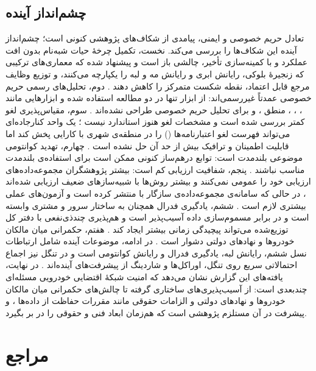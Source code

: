 \documentclass[12pt,a4paper]{article}
\begin{document}
\subsection{چشم‌انداز آینده}

تعادل حریم خصوصی و ایمنی، پیامدی از شکاف‌های پژوهشی کنونی است؛ چشم‌انداز آینده این شکاف‌ها را بررسی می‌کند. نخست، تکمیل چرخهٔ حیات شبه‌نام بدون افت عملکرد و با کمینه‌سازی تأخیر، چالشی باز است \cite{rahmawatiagustinaSystematicLiteratureReview2025} و پیشنهاد شده که معماری‌های ترکیبی که زنجیرهٔ بلوکی، رایانش ابری و رایانش مه و لبه را یکپارچه می‌کنند، و توزیع وظایف مرجع قابل اعتماد، نقطه شکست متمرکز را کاهش دهند \cite{rahmawatiagustinaSystematicLiteratureReview2025}. دوم، تحلیل‌های رسمی حریم خصوصی عمدتاً غیررسمی‌اند: از ابزار  تنها در دو مطالعه استفاده شده و ابزار‌هایی مانند ، ، ، منطق ،  و  برای تحلیل حریم خصوصی طراحی نشده‌اند \cite{rahmawatiagustinaSystematicLiteratureReview2025}. سوم، مقیاس‌پذیری لغو کمتر بررسی شده است و مشخصات لغو  هنوز استاندارد نیست \cite{mazzocca2025survey}؛ یک واحد کنارجاده‌ای می‌تواند فهرست لغو اعتبارنامه‌ها () را در منطقه‌ی شهری با کارایی پخش کند اما قابلیت اطمینان و ترافیک بیش از حد آن حل نشده است \cite{farsimadanReviewSecurityChallenges2025}. چهارم، تهدید کوانتومی موضوعی بلندمدت است: توابع درهم‌ساز کنونی ممکن است برای استفاده‌ی بلندمدت مناسب نباشند \cite{rahmawatiagustinaSystematicLiteratureReview2025}. پنجم، شفافیت ارزیابی کم است: بیشتر پژوهشگران مجموعه‌داده‌های ارزیابی خود را عمومی نمی‌کنند و بیشتر روش‌ها با شبیه‌سازهای ضعیف ارزیابی شده‌اند \cite{farsimadanReviewSecurityChallenges2025}، در حالی که سامانه‌ی  مجموعه‌داده‌ی سازگار با  منتشر کرده است \cite{feraudoDIVADIDbasedReputation2024} و آزمون‌های عملی بیشتری لازم است \cite{luPseudonymChangingSocial2012}. ششم، یادگیری فدرال همچنان به ساختار سرور و مشتری وابسته است و در برابر مسموم‌سازی داده آسیب‌پذیر است \cite{farsimadanReviewSecurityChallenges2025} و هم‌پذیری چندذی‌نفعی با دفتر کل توزیع‌شده می‌تواند پیچیدگی زمانی بیشتر ایجاد کند \cite{farsimadanReviewSecurityChallenges2025}. هفتم، حکمرانی میان مالکان خودرو‌ها و نهاد‌های دولتی دشوار است \cite{razaBlockchainBasedReputationTrust2024}. در ادامه، موضوعات آینده شامل ارتباطات  نسل ششم، رایانش لبه، یادگیری فدرال و رایانش کوانتومی است \cite{hozouriOverviewVANETVehicular2023} و در تنگل نیز اجماع احتمالاتی سریع روی تنگل، اوراکل‌ها و شاردینگ از پیشرفت‌های آینده‌اند \cite{sealeyIOTATangle202022}. در نهایت، یافته‌های این گزارش نشان می‌دهد که امنیت شبکهٔ اقتضایی خودرویی مسئله‌ای چندبعدی است: از آسیب‌پذیری‌های ساختاری گرفته تا چالش‌های حکمرانی میان مالکان خودرو‌ها و نهاد‌های دولتی \cite{razaBlockchainBasedReputationTrust2024} و الزامات حقوقی مانند مقررات حفاظت از داده‌ها \cite{mazzocca2025survey}، و پیشرفت در آن مستلزم پژوهشی است که هم‌زمان ابعاد فنی و حقوقی را در بر بگیرد.

\newpage

\section*{مراجع}

\begin{latin}
\printbibliography[heading=none]
\end{latin}
\end{document}

